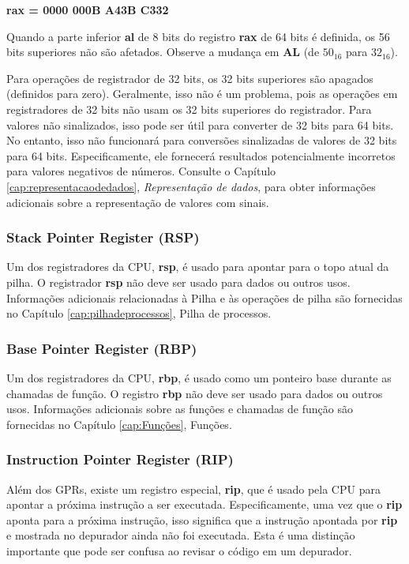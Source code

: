 \begin{center}
	\textbf{rax = 0000 000B A43B C332}
\end{center}

Quando a parte inferior \textbf{al} de 8 bits do registro \textbf{rax} de 64 bits é definida, os 56 bits superiores não são afetados. Observe a mudança em \textbf{AL} (de $ 50_{16} $ para $ 32_{16}$).

Para operações de registrador de 32 bits, os 32 bits superiores são apagados (definidos para zero). Geralmente, isso não é um problema, pois as operações em registradores de 32 bits não usam os 32 bits superiores do registrador. Para valores não sinalizados, isso pode ser útil para converter de 32 bits para 64 bits.
No entanto, isso não funcionará para conversões sinalizadas de valores de 32 bits para 64 bits.
Especificamente, ele fornecerá resultados potencialmente incorretos para valores negativos de números.
Consulte o Capítulo \ref{cap:representacaodedados}, \textit{Representação de dados}, para obter informações adicionais sobre a representação de valores com sinais.

\subsubsection{Stack Pointer Register (RSP)}
Um dos registradores da CPU, \textbf{rsp}, é usado para apontar para o topo atual da pilha. O registrador \textbf{rsp} não deve ser usado para dados ou outros usos. Informações adicionais relacionadas à Pilha e às operações de pilha são fornecidas no Capítulo \ref{cap:pilhadeprocessos}, Pilha de processos.

\subsubsection{Base Pointer Register (RBP)}
Um dos registradores da CPU, \textbf{rbp}, é usado como um ponteiro base durante as chamadas de função. O registro \textbf{rbp} não deve ser usado para dados ou outros usos. Informações adicionais sobre as funções e chamadas de função são fornecidas no Capítulo \ref{cap:Funções}, Funções.


\subsubsection{Instruction Pointer Register (RIP)}
Além dos GPRs, existe um registro especial, \textbf{rip}, que é usado pela CPU para apontar a próxima instrução a ser executada. Especificamente, uma vez que o \textbf{rip} aponta para a próxima instrução, isso significa que a instrução apontada por \textbf{rip} e mostrada no depurador ainda não foi executada. Esta é uma distinção importante que pode ser confusa ao revisar o código em um depurador.

